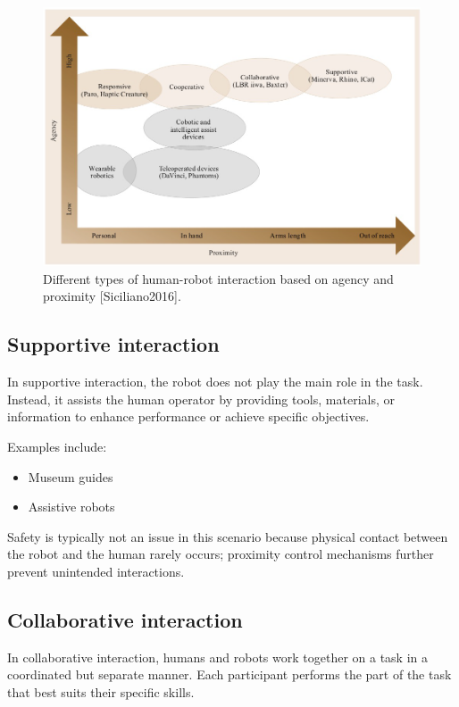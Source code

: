 \begin{figure}[H]
  \centering
  \includegraphics[width=\linewidth]{imgs/hri_interaction_types.png}
  \caption{Different types of human-robot interaction based on agency and proximity [Siciliano2016].}
\end{figure}

\hfill

\subsection{Supportive interaction}

In supportive interaction, the robot does not play the main role in the task. Instead, it assists the human operator by providing tools, materials, or information to enhance performance or achieve specific objectives.

Examples include:
\begin{itemize}
  \item Museum guides
  \item Assistive robots
\end{itemize}

Safety is typically not an issue in this scenario because physical contact between the robot and the human rarely occurs; proximity control mechanisms further prevent unintended interactions.

\hfill

\subsection{Collaborative interaction}

In collaborative interaction, humans and robots work together on a task in a coordinated but separate manner. Each participant performs the part of the task that best suits their specific skills.


